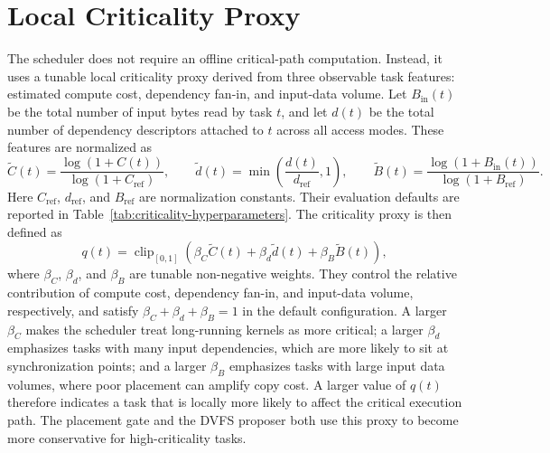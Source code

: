 \section{Local Criticality Proxy}
\label{sec:methods-criticality-proxy}

The scheduler does not require an offline critical-path computation. Instead, it uses a tunable local criticality proxy derived from three observable task features: estimated compute cost, dependency fan-in, and input-data volume. Let $B_{\mathrm{in}}(t)$ be the total number of input bytes read by task $t$, and let $d(t)$ be the total number of dependency descriptors attached to $t$ across all access modes. These features are normalized as
\begin{equation}
\widetilde{C}(t)=\frac{\log(1+C(t))}{\log(1+C_{\mathrm{ref}})},
\qquad
\widetilde{d}(t)=\min\left(\frac{d(t)}{d_{\mathrm{ref}}},1\right),
\qquad
\widetilde{B}(t)=\frac{\log(1+B_{\mathrm{in}}(t))}{\log(1+B_{\mathrm{ref}})}.
\end{equation}
Here $C_{\mathrm{ref}}$, $d_{\mathrm{ref}}$, and $B_{\mathrm{ref}}$ are normalization constants. Their evaluation defaults are reported in Table~\ref{tab:criticality-hyperparameters}.
The criticality proxy is then defined as
\begin{equation}
q(t)
=
\operatorname{clip}_{[0,1]}
\left(
\beta_C\widetilde{C}(t)
+
\beta_d\widetilde{d}(t)
+
\beta_B\widetilde{B}(t)
\right),
\label{eq:criticality-proxy}
\end{equation}
where $\beta_C$, $\beta_d$, and $\beta_B$ are tunable non-negative weights. They control the relative contribution of compute cost, dependency fan-in, and input-data volume, respectively, and satisfy $\beta_C+\beta_d+\beta_B=1$ in the default configuration.
A larger $\beta_C$ makes the scheduler treat long-running kernels as more critical; a larger $\beta_d$ emphasizes tasks with many input dependencies, which are more likely to sit at synchronization points; and a larger $\beta_B$ emphasizes tasks with large input data volumes, where poor placement can amplify copy cost. A larger value of $q(t)$ therefore indicates a task that is locally more likely to affect the critical execution path. The placement gate and the DVFS proposer both use this proxy to become more conservative for high-criticality tasks.

